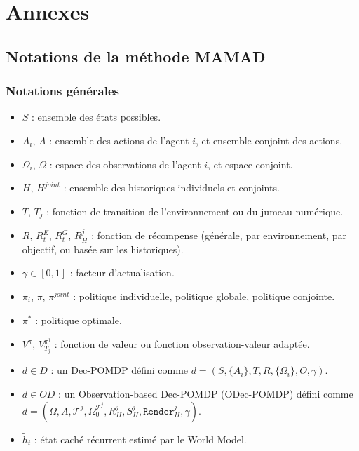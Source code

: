 \clearpage
\thispagestyle{empty}
\null
\newpage

\cleardoublepage
{}
{}
\part*{Annexes}
\label{part:annexes}

\clearpage
\thispagestyle{empty}
\null
\newpage

\chapter{Notations de la méthode MAMAD}\label{appendix:notations}

\section{Notations générales}

\begin{itemize}
       \item $S$ : ensemble des états possibles.
       \item $A_i$, $A$ : ensemble des actions de l'agent $i$, et ensemble conjoint des actions.
       \item $\Omega_i$, $\Omega$ : espace des observations de l'agent $i$, et espace conjoint.
       \item $H$, $H^{joint}$ : ensemble des historiques individuels et conjoints.
       \item $T$, $T_j$ : fonction de transition de l'environnement ou du jumeau numérique.
       \item $R$, $R^E_t$, $R^G_t$, $R^j_H$ : fonction de récompense (générale, par environnement, par objectif, ou basée sur les historiques).
       \item $\gamma \in [0,1]$ : facteur d'actualisation.
       \item $\pi_i$, $\pi$, $\pi^{joint}$ : politique individuelle, politique globale, politique conjointe.
       \item $\pi^*$ : politique optimale.
       \item $V^\pi$, $V^{\pi^j}_{T_j}$ : fonction de valeur ou fonction observation-valeur adaptée.
       \item $d \in D$ : un Dec-POMDP défini comme $d = (S,\{A_i\},T,R,\{\Omega_i\},O,\gamma)$.
       \item $d \in OD$ : un Observation-based Dec-POMDP (ODec-POMDP) défini comme $d = (\Omega, A, \mathcal{T}^j, \Omega^{\mathcal{T}^j}_0, R^j_H, S^j_H, \texttt{Render}^j_H, \gamma)$.
       \item $\tilde{h}_t$ : état caché récurrent estimé par le World Model.
\end{itemize}

